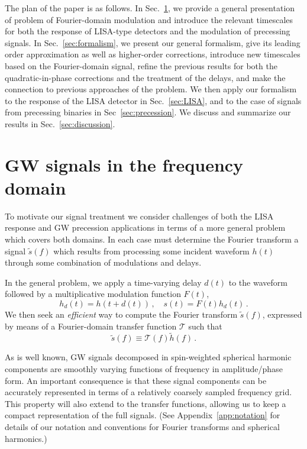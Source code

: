 \documentclass[aps,showpacs,twocolumn,
prd,superscriptaddress,nofootinbib]{revtex4-1}
\newcommand{\be}{\begin{equation}}
\newcommand{\ee}{\end{equation}}
\newcommand\calT{{\mathcal{T}}}
\newcommand{\jgb}[1]{{\color{DarkGreen} #1}}
\begin{document}
The plan of the paper is as follows. In Sec.~\ref{sec:motivation}, we provide a general presentation of problem of Fourier-domain modulation and introduce the relevant timescales for both the response of LISA-type detectors and the modulation of precessing signals. In Sec.~\ref{sec:formalism}, we present our general formalism, give its leading order approximation as well as higher-order corrections, introduce new timescales based on the Fourier-domain signal, refine the previous results for both the quadratic-in-phase corrections and the treatment of the delays, and make the connection to previous approaches of the problem. We then apply our formalism to the response of the LISA detector in Sec.~\ref{sec:LISA}, and to the case of signals from precessing binaries in Sec~\ref{sec:precession}. We discuss and summarize our results in Sec.~\ref{sec:discussion}.


\section{GW signals in the frequency domain}
\label{sec:motivation}



\jgb{To motivate our signal treatment we consider challenges of both the LISA response and GW precession applications in terms of a more general problem which covers both domains. In each case must determine the Fourier transform a signal $\tilde s(f)$ which results from processing some incident waveform $h(t)$ through some combination of modulations and delays.}

In the general problem, we apply a time-varying delay $d(t)$ to the waveform followed by a multiplicative modulation function $F(t)$,
\be
\label{eq:delay-mod-defs}
	h_{d}(t) = h(t+d(t)) \,, \quad s(t) = F(t)h_{d}(t) \,.
\ee
We then seek an \textit{efficient} way to compute the Fourier transform $\tilde{s}(f)$, expressed by means of a Fourier-domain transfer function $\calT$ such that
\be\label{eq:deftransfer}
	\tilde{s}(f) \equiv \calT(f) \tilde{h}(f) \,. 
\ee

As is well known, GW signals decomposed in spin-weighted spherical harmonic components are smoothly varying functions of frequency in amplitude/phase form\cite{smoothAmpPhaseRefs}. An important consequence is that these signal components can be accurately represented in terms of a relatively coarsely sampled frequency grid. This property will also extend to the transfer functions, allowing us to keep a compact representation of the full signals. (See Appendix~\ref{app:notation} for details of our notation and conventions for Fourier transforms and spherical harmonics.)
\end{document}
